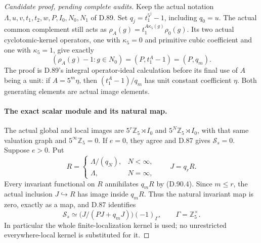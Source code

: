 \begin{proof}[Candidate proof, pending complete audits]
Keep the actual notation \(\Lambda,u,v,t_1,t_2,w,P,I_0,N_0,N_1\)
of D.89. Set \(q_j=t_1^{5^j}-1\), including \(q_0=u\).
The actual common complement still acts as
\(\rho_A(g)=t_1^{A\kappa_5(g)}\rho_0(g)\).
Its two actual cyclotomic-kernel operators, one with
\(\kappa_5=0\) and primitive cubic coefficient and one
with \(\kappa_5=1\), give exactly
\[
       (\rho_A(g)-1:g\in N_0)=(P,t_1^A-1)=(P,q_m).
                                                               \tag{D.90.4}
\]
The proof is D.89's integral operator-ideal calculation before
its final use of \(A\) being a unit: if \(A=5^m\eta\),
then \((t_1^A-1)/q_m\) has unit constant coefficient
\(\eta\). Both generating elements are actual image elements.

\paragraph{The exact scalar module and its natural map.}
The actual global and local images are
\(5^r\mathbb Z_5\rtimes I_0\) and
\(5^N\mathbb Z_5\rtimes I_0\), with that same valuation
graph and \(5^\infty\mathbb Z_5=0\). If \(e=0\), they
agree and D.87 gives \(\mathcal S_s=0\).
Suppose \(e>0\). Put
\[
 R=\begin{cases}\Lambda/(q_N),&N<\infty,\\
                 \Lambda,&N=\infty,\end{cases}
                  \qquad J=q_rR.
\]
Every invariant functional on \(R\) annihilates \(q_mR\)
by (D.90.4). Since \(m\le r\), the actual inclusion
\(J\hookrightarrow R\) has image inside \(q_mR\).
Thus the natural invariant map is zero, exactly as a map,
and D.87 identifies
\[
 \mathcal S_s\simeq
              \bigl(J/(PJ+q_mJ)\bigr)(-1)_\Gamma,
                  \qquad \Gamma=\mathbb Z_5^\times.    \tag{D.90.5}
\]
In particular the whole finite-localization kernel is used;
no unrestricted everywhere-local kernel is substituted for it.


\end{proof}
